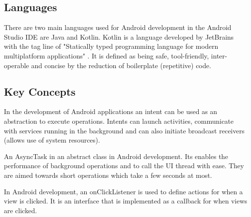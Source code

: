 \subsection*{Languages}
There are two main languages used for Android development in the Android Studio IDE are Java and Kotlin.
Kotlin is a language developed by JetBrains with the tag line of "Statically typed programming language for modern multiplatform applications" \parencite{kotlin}.
It is defined as being safe, tool-friendly, inter-operable and concise by the reduction of boilerplate (repetitive) code.

\subsection*{Key Concepts}
In the development of Android applications an intent can be used as an abstraction to execute operations.
Intents can launch activities, communicate with services running in the background and can also initiate broadcast receivers (allows use of system resources).

An AsyncTask in an abstract class in Android development.
Its enables the performance of background operations and to call the UI thread with ease.
They are aimed towards short operations which take a few seconds at most.

In Android development, an onClickListener is used to define actions for when a view is clicked.
It is an interface that is implemented as a callback for when views are clicked.